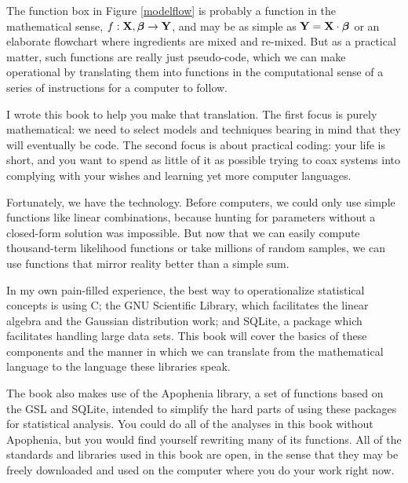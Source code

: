 \begin{multicols}{2}
 The function box in Figure \ref{modelflow} is probably a
function in the mathematical sense, $f:{\bf X}, {\mbox{\boldmath$\beta$}} \to {\bf Y}$, and may
be as simple as ${\bf Y} = {\bf X}\cdot {\mbox{\boldmath$\beta$}}$ or an elaborate flowchart where
ingredients are mixed and re-mixed.  But as a practical matter, such
functions are really just pseudo-code, which we can make operational by
translating them into functions in the computational sense of a series
of instructions for a computer to follow.

I wrote this book to help you make that translation. The first focus
is purely mathematical: we need to select models and techniques bearing
in mind that they will eventually be code. The second focus is about
practical coding: your life is short, and you want to spend as little
of it as possible trying to coax systems into complying with your wishes
and learning yet more computer languages.

Fortunately, we have the technology. Before computers, we could only
use simple functions like linear combinations, because hunting for
parameters without a closed-form solution was impossible. 
But now that we can easily compute thousand-term likelihood functions
or take millions of random samples, we can use functions that mirror
reality better than a simple sum.


In my own pain-filled experience, the best way to operationalize
statistical concepts is using C; the GNU Scientific Library,  which
facilitates the linear algebra and the Gaussian distribution work;
and SQLite, a package which facilitates handling large data sets. This
book will cover the basics of these components and the manner in which
we can translate from the mathematical language to the language these
libraries speak.

The book also makes use of the Apophenia library, a set of functions 
based on the GSL and SQLite, intended to simplify the hard parts of
using these packages for statistical analysis. You could do all of the
analyses in this book without Apophenia, but you would find yourself
rewriting many of its functions.  All of the standards and libraries
used in this book are open, in the sense that they may be freely
downloaded and used on the computer where you do your work right now.


\end{multicols}

